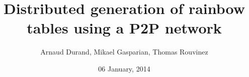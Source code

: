 \documentclass[a4paper]{article}
\begin{document}


\newenvironment{listCustom}{
 \begin{list}{{$\bullet$}}{		%
  \setlength{\partopsep}{0pt}
  \setlength{\parskip}{0pt}
  \setlength{\parsep}{0pt}
  \setlength{\topsep}{5mm}
  \setlength{\itemsep}{1mm}		%
  \setlength{\labelsep}{0.25cm} %
  \setlength{\leftmargin}{2cm}  %
 }
}{
 \end{list}
}

{\setlength{\leftmargini}{2cm} 
\newenvironment{listCustomNumber}{
 \begin{enumerate}{		%
  \setlength{\leftmargin}{2cm}  %
 }
}{
 \end{enumerate}
}

\newcommand*{\xml}[1]{\texttt{<#1>}}

\newcommand*{\webquote}[1]{\textsf{\og #1 \fg{}}}
\renewcommand*\abstractname{Abstract}
\renewcommand*\contentsname{Table of Contents}
	

\title{Distributed generation of rainbow tables using a P2P network}

\author{Arnaud Durand, Mikael Gasparian, Thomas Rouvinez}
\date{06 January, 2014}


\rrno{}
\maketitle

\pagebreak


	
\tableofcontents

\pagebreak



}
\end{document}
